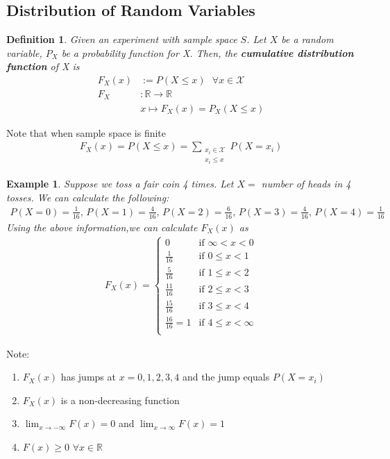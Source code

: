 \documentclass[11pt,oneside]{book}
\theoremstyle{newStyle}
\newtheorem{defn}[thm]{Definition}
\newtheorem{ex}{Example}[section]
\newcommand{\R}{\mathbb{R}}
\newcommand{\X}{\mathcal{X}}
\newcommand{\note}{\color{red}Note: \color{black}}
\begin{document}
\subsection[Distribution of Random Variables]{Distribution of Random Variables}
\begin{defn}
Given an experiment with sample space $S$. Let $X$ be a random variable, $P_X$ be a probability function for X. Then, the \textbf{cumulative distribution function} of X is \begin{align*}
F_X(x)&:=P(X\leq x)\text{ }\forall x\in \X\\
F_X&:\R\longrightarrow\R\\
&x\mapsto F_X(x)=P_X(X\leq x)
\end{align*}
\end{defn}
Note that when sample space is finite \begin{align*} 
F_X(x)=P(X\leq x)=\sum_{\substack{x_i\in \X\\ x_i\leq x}}P(X=x_i)
\end{align*}
\begin{ex}
Suppose we toss a fair coin 4 times. Let $X=$ number of heads in 4  tosses. We can calculate the following:\begin{align*}
P(X=0)=\frac{1}{16}\text{, }P(X=1)=\frac{4}{16}\text{, }P(X=2)=\frac{6}{16}\text{, }P(X=3)=\frac{4}{16}\text{, }P(X=4)=\frac{1}{16}
\end{align*}
Using the above information,we can calculate $F_X(x)$ as \begin{align*}
F_X(x)=\begin{cases}
0 & \text{if }\infty<x<0\\
\frac{1}{16}& \text{if }0\leq x<1\\
\frac{5}{16}& \text{if }1\leq x<2\\
\frac{11}{16}& \text{if }2\leq x<3\\
\frac{15}{16}& \text{if }3\leq x<4\\
\frac{16}{16}=1& \text{if }4\leq x<\infty \\
\end{cases}
\end{align*}
\end{ex}
\note \begin{enumerate}[itemsep=0pt, topsep=1pt, partopsep=0pt]
\item $F_X(x)$ has jumps at $x=0,1,2,3,4$ and the jump equals $P(X=x_i)$
\item $F_X(x)$ is a non-decreasing function
\item $\lim_{x\to -\infty}F(x)=0$ and $\lim_{x\to \infty}F(x)=1$
\item $F(x)\geq 0$ $\forall x\in \R$
\end{enumerate}
\end{document}
